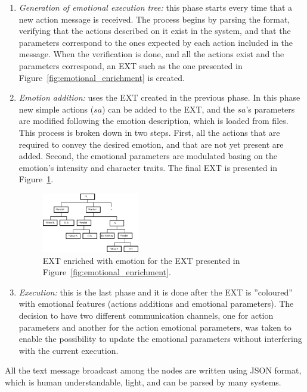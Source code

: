 \begin{enumerate}
	\item \textit{Generation of emotional execution tree:} this phase starts every time that a new action message is received. The process begins by parsing the format, verifying that the actions described on it exist in the system, and that the parameters correspond to the ones expected by each action included in the message. 
When the verification is done, and all the actions exist and the parameters correspond, an EXT such as the one presented in Figure~\ref{fig:emotional_enrichment} is created.
	\item \textit{Emotion addition:} uses the EXT created in the previous phase. In this phase new simple actions ($sa$)
can be added to the EXT, and the $sa$'s parameters are modified following the emotion description, which is loaded from files. This process is broken down in two steps. First, all the actions that are required to convey the desired emotion, and that are not yet present are added. Second, the emotional parameters are modulated basing on the emotion's intensity and character traits. The final EXT is presented in Figure~\ref{fig:reference}.
	\begin{figure}
		\centering
	\includegraphics[width=0.40\textwidth]{./Images/exampleTreeE.png}
	\caption{EXT enriched with emotion for the EXT presented in Figure~\ref{fig:emotional_enrichment}.} 
	\label{fig:reference}
	\end{figure}
	\item \textit{Execution:} this is the last phase and it is done after the EXT is ''coloured'' with emotional features (actions additions and emotional parameters). The decision to have two different communication channels, one for action parameters and another for the action emotional parameters, was taken to enable the possibility to update the emotional parameters without interfering with the current execution. 
\end{enumerate}

All the text message broadcast among the nodes are written using JSON format, which is human understandable, light, and can be parsed by many systems.
 
